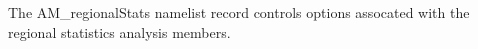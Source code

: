 The AM\_regionalStats namelist record controls options assocated with the regional statistics analysis members.
